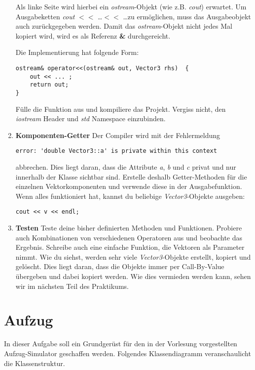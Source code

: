 \begin{enumerate}
Als linke Seite wird hierbei ein \emph{ostream}-Objekt (wie z.B. \emph{cout}) erwartet.
Um Ausgabeketten \emph{cout} \textbf{$<<$} \dots \textbf{$<<$} \dots zu ermöglichen, muss das Ausgabeobjekt auch zurückgegeben werden. Damit das \emph{ostream}-Objekt nicht jedes Mal kopiert wird, wird es als Referenz \textbf{\&} durchgereicht.

Die Implementierung hat folgende Form:
\begin{lstlisting}
ostream& operator<<(ostream& out, Vector3 rhs)  {
	out << ... ;
	return out;
}
\end{lstlisting}

Fülle die Funktion aus und kompiliere das Projekt.
Vergiss nicht, den \emph{iostream} Header und \emph{std} Namespace einzubinden.

\item\textbf{Komponenten-Getter}
Der Compiler wird mit der Fehlermeldung 
\begin{verbatim}
error: 'double Vector3::a' is private within this context
\end{verbatim}
abbrechen.
Dies liegt daran, dass die Attribute \emph{a}, \emph{b} und \emph{c} privat und nur innerhalb der Klasse sichtbar sind.
Erstelle deshalb Getter-Methoden für die einzelnen Vektorkomponenten und verwende diese in der Ausgabefunktion.
Wenn alles funktioniert hat, kannst du beliebige \emph{Vector3}-Objekte ausgeben:
\begin{lstlisting}
cout << v << endl;
\end{lstlisting} 

\item\textbf{Testen}
Teste deine bisher definierten Methoden und Funktionen.
Probiere auch Kombinationen von verschiedenen Operatoren aus und beobachte das Ergebnis.
Schreibe auch eine einfache Funktion, die Vektoren als Parameter nimmt. 
Wie du siehst, werden sehr viele \emph{Vector3}-Objekte erstellt, kopiert und gelöscht.
Dies liegt daran, dass die Objekte immer per Call-By-Value übergeben und dabei kopiert werden.
Wie dies vermieden werden kann, sehen wir im nächsten Teil des Praktikums.

\end{enumerate}


\section{Aufzug}
In dieser Aufgabe soll ein Grundgerüst für den in der Vorlesung vorgestellten Aufzug-Simulator geschaffen werden.
Folgendes Klassendiagramm veranschaulicht die Klassenstruktur.

